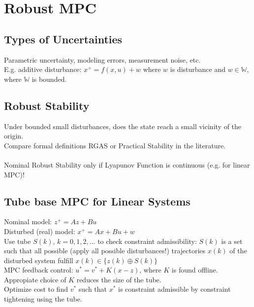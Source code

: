 \documentclass[english]{latex4ei/latex4ei_sheet}
\begin{document}
\section{Robust MPC}
\begin{sectionbox}

\subsection{Types of Uncertainties}
Parametric uncertainty, modeling errors, measurement noise, etc.\\
E.g. additive disturbance: $x^{+}=f(x,u)+w$ where $w$ is disturbance and $w\in\mathbb{W}$, where $\mathbb{W}$ is bounded.\\
\subsection{Robust Stability}
Under bounded small disturbances, does the state reach a small vicinity of the origin.\\
Compare formal definitions RGAS or Practical Stability in the literature.\\
\\
Nominal Robust Stability only if Lyapunov Function is continuous (e.g. for linear MPC)!\\

\subsection{Tube base MPC for Linear Systems}
Nominal model: $z^{+}=Az+Bu$\\
Disturbed (real) model: $x^{+}=Ax+Bu+w$\\
Use tube $S(k)$, $k=0,1,2,\ldots$ to check constraint admissibility: $S(k)$ is a set such that all possible (apply all possible disturbances!) trajectories $x(k)$ of the disturbed system fulfill $x(k)\in\{z(k) \oplus S(k)\}$\\
MPC feedback control: $u^{*}=v^{*}+K(x-z)$, where $K$ is found offline. Appropiate choice of $K$ reduces the size of the tube.\\
Optimize cost to find $v^{*}$ such that $x^{*}$ is constraint admissible by constraint tightening using the tube.

\end{sectionbox}


\end{document}
